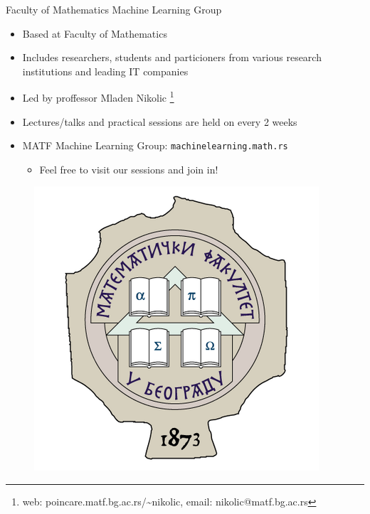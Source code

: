 \documentclass[aspectratio=169]{beamer}
\begin{document}
\begin{frame}{Faculty of Mathematics Machine Learning Group}
    \begin{itemize}
        \item Based at Faculty of Mathematics
        \item Includes researchers, students and particioners from various research institutions and leading IT companies
        \item Led by proffessor Mladen Nikolic \footnote{web: poincare.matf.bg.ac.rs/\sim nikolic, email: nikolic@matf.bg.ac.rs}
        \item Lectures/talks and practical sessions are held on every 2 weeks
        \item MATF Machine Learning Group: \texttt{machinelearning.math.rs}
            \begin{itemize}
                \item Feel free to visit our sessions and join in!
            \end{itemize}
    \end{itemize}
     \begin{center}
        \begin{figure}
            \includegraphics[scale=0.2]{./images/matf_logo.png}
        \end{figure}
    \end{center}
\end{frame}
\end{document}
